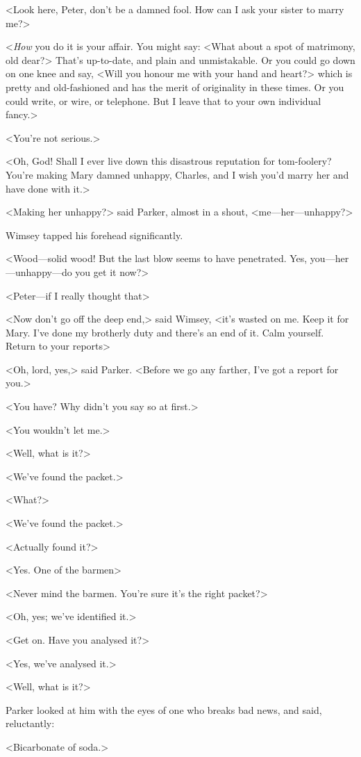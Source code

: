 <Look here, Peter, don't be a damned fool. How can I ask your sister to marry me?>

<\emph{How} you do it is your affair. You might say: <What about a spot of matrimony, old dear?> That's up-to-date, and plain and unmistakable. Or you could go down on one knee and say, <Will you honour me with your hand and heart?> which is pretty and old-fashioned and has the merit of originality in these times. Or you could write, or wire, or telephone. But I leave that to your own individual fancy.>

<You're not serious.>

<Oh, God! Shall I ever live down this disastrous reputation for tom-foolery? You're making Mary damned unhappy, Charles, and I wish you'd marry her and have done with it.>

<Making her unhappy?> said Parker, almost in a shout, <me—her—unhappy?>

Wimsey tapped his forehead significantly.

<Wood—solid wood! But the last blow seems to have penetrated. Yes, you—her—unhappy—do you get it now?>

<Peter—if I really thought that\longdash>

<Now don't go off the deep end,> said Wimsey, <it's wasted on me. Keep it for Mary. I've done my brotherly duty and there's an end of it. Calm yourself. Return to your reports\longdash>

<Oh, lord, yes,> said Parker. <Before we go any farther, I've got a report for you.>

<You have? Why didn't you say so at first.>

<You wouldn't let me.>

<Well, what is it?>

<We've found the packet.>

<What?>

<We've found the packet.>

<Actually found it?>

<Yes. One of the barmen\longdash>

<Never mind the barmen. You're sure it's the right packet?>

<Oh, yes; we've identified it.>

<Get on. Have you analysed it?>

<Yes, we've analysed it.>

<Well, what is it?>

Parker looked at him with the eyes of one who breaks bad news, and said, reluctantly:

<Bicarbonate of soda.>